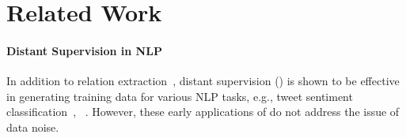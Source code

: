 \section{Related Work}

\paragraph{Distant Supervision in NLP} In addition to relation extraction~\cite{mintz2009distant}, distant supervision
(\DS) is shown to be effective in generating training data for various NLP tasks, e.g., tweet sentiment
classification~\cite{go2009twitter}, ~\cite{ritter2011named}.
However, these early applications of \DS do not address the issue of data noise.


